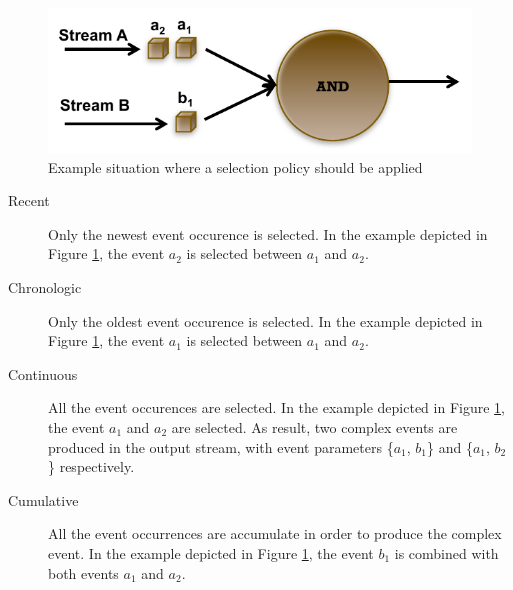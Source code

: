 \begin{figure}[H]
  \begin{center}
    \includegraphics[scale=0.65]{chap3/images/selectionpolicy.pdf}
  \end{center}
  \caption{Example situation where a selection policy should be applied}
  \label{fig:selectionpolicy}
\end{figure}
\begin{description}
  \item[Recent]  Only the newest event occurence is selected. In the example depicted in Figure \ref{fig:selectionpolicy}, the event $a_2$ is selected between $a_1$ and $a_2$.
  \item[Chronologic]  Only the oldest event occurence is selected. In the example depicted in Figure \ref{fig:selectionpolicy}, the event $a_1$ is selected between $a_1$ and $a_2$.
  \item[Continuous] All the event occurences are selected. In the example depicted in Figure \ref{fig:selectionpolicy}, the event $a_1$ and $a_2$ are selected. As result, two complex events are produced in the output stream, with event parameters \{$a_1$, $b_1$\} and \{$a_1$, $b_2$\} respectively.
  \item[Cumulative]  All the event occurrences are accumulate in order to produce the complex event. In the example depicted in Figure \ref{fig:selectionpolicy}, the event $b_1$ is combined with both events $a_1$ and $a_2$.
\end{description}

